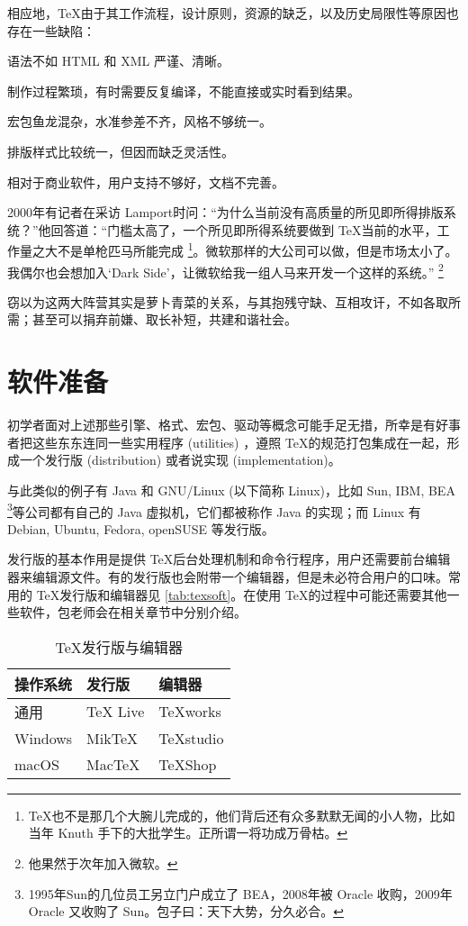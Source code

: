相应地，\TeX 由于其工作流程，设计原则，资源的缺乏，以及历史局限性等原因也存在一些缺陷：
\begin{compactitem}
   \item 语法不如 HTML 和 XML 严谨、清晰。
   \item 制作过程繁琐，有时需要反复编译，不能直接或实时看到结果。
   \item 宏包鱼龙混杂，水准参差不齐，风格不够统一。
   \item 排版样式比较统一，但因而缺乏灵活性。
   \item 相对于商业软件，用户支持不够好，文档不完善。
\end{compactitem}

2000年有记者在采访 Lamport\indexLamport{}时问：“为什么当前没有高质量的所见即所得排版系统？”他回答道：“门槛太高了，一个所见即所得系统要做到 \TeX 当前的水平，工作量之大不是单枪匹马所能完成 \footnote{\TeX 也不是那几个大腕儿完成的，他们背后还有众多默默无闻的小人物，比如当年 Knuth 手下的大批学生。正所谓一将功成万骨枯。}。微软那样的大公司可以做，但是市场太小了。我偶尔也会想加入‘Dark Side’，让微软给我一组人马来开发一个这样的系统。” \footnote{他果然于次年加入微软。}

窃以为这两大阵营其实是萝卜青菜的关系，与其抱残守缺、互相攻讦，不如各取所需；甚至可以捐弃前嫌、取长补短，共建和谐社会。

\section{软件准备}

初学者面对上述那些引擎、格式、宏包、驱动等概念可能手足无措，所幸是有好事者把这些东东连同一些实用程序 (utilities) ，遵照 \TeX 的规范打包集成在一起，形成一个发行版 (distribution) 或者说实现 (implementation)。

与此类似的例子有 Java 和 GNU/Linux (以下简称 Linux)，比如 Sun, IBM, BEA \footnote{1995年Sun的几位员工另立门户成立了 BEA，2008年被 Oracle 收购，2009年 Oracle 又收购了 Sun。包子曰：天下大势，分久必合。}等公司都有自己的 Java 虚拟机，它们都被称作 Java 的实现；而 Linux 有Debian, Ubuntu, Fedora, openSUSE 等发行版。

发行版的基本作用是提供 \TeX 后台处理机制和命令行程序，用户还需要前台编辑器来编辑源文件。有的发行版也会附带一个编辑器，但是未必符合用户的口味。常用的 \TeX 发行版和编辑器见 \autoref{tab:texsoft}。在使用 \TeX 的过程中可能还需要其他一些软件，包老师会在相关章节中分别介绍。

\begin{table}[htbp]
\caption{\TeX 发行版与编辑器}
\label{tab:texsoft}
\centering
\begin{tabular}{lll}
   \toprule
    操作系统 & 发行版 & 编辑器 \\
   \midrule
    通用        & TeX Live  & TeXworks \\
    Windows     & MikTeX    & TeXstudio \\
    macOS       & MacTeX    & TeXShop \\

   \bottomrule
\end{tabular}
\end{table}

